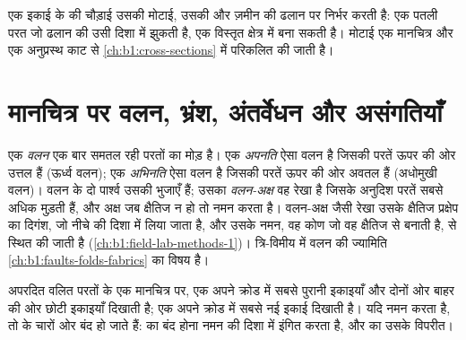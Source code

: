 \begin{remark}[बहिर्भाग की चौड़ाई]\label{rem:b1:geological-maps:width}
एक इकाई के  की चौड़ाई उसकी मोटाई, उसकी  और ज़मीन की ढलान पर निर्भर करती है: एक पतली परत जो
ढलान की उसी दिशा में झुकती है, एक विस्तृत क्षेत्र में  बना सकती है। मोटाई एक मानचित्र और एक
अनुप्रस्थ काट से \cref{ch:b1:cross-sections} में परिकलित की जाती है।
\end{remark}

\section{मानचित्र पर वलन, भ्रंश, अंतर्वेधन और असंगतियाँ}

\begin{definition}[अपनति और अभिनति]\label{def:b1:geological-maps:fold}
एक \emph{वलन} एक बार समतल रही परतों का मोड़ है। एक
\emph{अपनति} ऐसा वलन है जिसकी परतें ऊपर की ओर उत्तल हैं (ऊर्ध्व वलन); एक
\emph{अभिनति} ऐसा वलन है जिसकी परतें ऊपर की ओर अवतल हैं (अधोमुखी वलन)। वलन के दो पार्श्व उसकी
भुजाएँ हैं; उसका \emph{वलन-अक्ष} वह रेखा है जिसके अनुदिश परतें सबसे अधिक मुड़ती हैं, और
अक्ष जब क्षैतिज न हो तो नमन करता है। वलन-अक्ष जैसी रेखा उसके क्षैतिज प्रक्षेप का
दिगंश, जो नीचे की दिशा में लिया जाता है, और उसके नमन, वह कोण जो वह क्षैतिज से बनाती है, से
स्थित की जाती है (\cref{ch:b1:field-lab-methods-1})। त्रि-विमीय में वलन की ज्यामिति \cref{ch:b1:faults-folds-fabrics}
का विषय है।
\end{definition}

\begin{proposition}[वलन के प्रारूप]\label{prop:b1:geological-maps:folds}
अपरदित वलित परतों के एक मानचित्र पर, एक  अपने क्रोड में सबसे पुरानी इकाइयाँ और दोनों ओर बाहर की ओर
छोटी इकाइयाँ दिखाती है; एक  अपने क्रोड में सबसे नई इकाई दिखाती है। यदि  नमन करता है, तो
  के चारों ओर बंद हो जाते हैं:  का बंद होना नमन की दिशा में इंगित करता है, और  का
उसके विपरीत।
\end{proposition}

